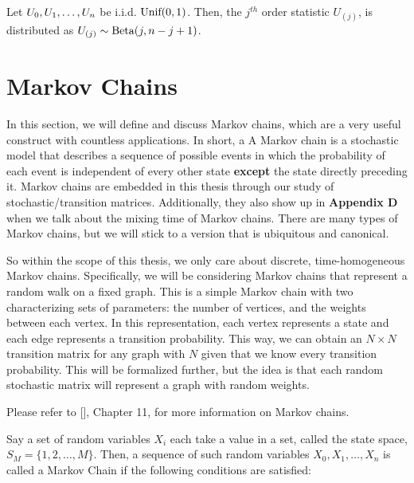 \begin{theorem}
Let $\seq[n]{U}$ be i.i.d. $\Unif(0, 1)$. Then, the $j^{th}$ order statistic $U_{(j)}$, is distributed as $U_{(j)} \sim \Beta(j, n-j+1)$.
\end{theorem}

\newpage
\section{Markov Chains}


In this section, we will define and discuss Markov chains, which are a very useful construct with countless applications.
In short, a A Markov chain is a stochastic model that describes a sequence of possible events in which the probability of each event is independent of every other state \textbf{except} the state directly preceding it.
Markov chains are embedded in this thesis through our study of stochastic/transition matrices. Additionally, they also show up in \textbf{Appendix D} when we talk about the mixing time of Markov chains.
There are many types of Markov chains, but we will stick to a version that is ubiquitous and canonical.

So within the scope of this thesis, we only care about discrete, time-homogeneous Markov chains.
Specifically, we will be considering Markov chains that represent a random walk on a fixed graph.
This is a simple Markov chain with two characterizing sets of parameters: the number of vertices, and the weights between each vertex.
In this representation, each vertex represents a state and each edge represents a transition probability.
This way, we can obtain an $N \times N$ transition matrix for any graph with $N$ given that we know every transition probability.
This will be formalized further, but the idea is that each random stochastic matrix will represent a graph with random weights.

Please refer to [\cite{blitz}], Chapter 11, for more information on Markov chains.

\begin{definition} Say a set of random variables $X_i$ each take a value in a set, called the state space, $S_M = \{1,2,\dots,M\}$. Then, a sequence of such random variables $X_0,X_1,\dots,X_n$ is called a Markov Chain if the following conditions are satisfied:
\end{definition}

